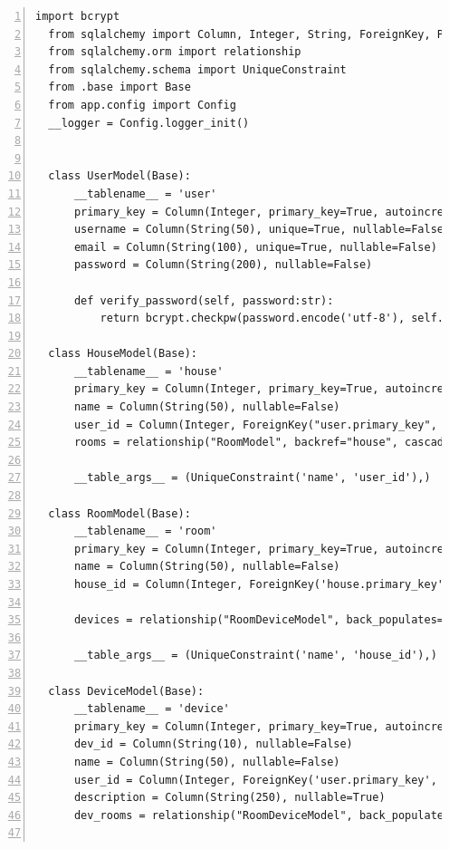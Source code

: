 \documentclass[12pt, letterpaper]{article}
\begin{document}
\begin{lstlisting}[frame=single, style=py, numbers=left, label={lst:dbmodels}, caption={db: models.py}]
  import bcrypt
  from sqlalchemy import Column, Integer, String, ForeignKey, PrimaryKeyConstraint
  from sqlalchemy.orm import relationship
  from sqlalchemy.schema import UniqueConstraint
  from .base import Base
  from app.config import Config
  __logger = Config.logger_init()
  
  
  class UserModel(Base):
      __tablename__ = 'user'
      primary_key = Column(Integer, primary_key=True, autoincrement=True, nullable=False)
      username = Column(String(50), unique=True, nullable=False)
      email = Column(String(100), unique=True, nullable=False)
      password = Column(String(200), nullable=False)
      
      def verify_password(self, password:str):
          return bcrypt.checkpw(password.encode('utf-8'), self.password)
  
  class HouseModel(Base):
      __tablename__ = 'house'
      primary_key = Column(Integer, primary_key=True, autoincrement=True, nullable=False)
      name = Column(String(50), nullable=False)
      user_id = Column(Integer, ForeignKey("user.primary_key", ondelete='CASCADE'), nullable=False)
      rooms = relationship("RoomModel", backref="house", cascade="all, delete-orphan", lazy='selectin')
  
      __table_args__ = (UniqueConstraint('name', 'user_id'),)
  
  class RoomModel(Base):
      __tablename__ = 'room'
      primary_key = Column(Integer, primary_key=True, autoincrement=True, nullable=False)
      name = Column(String(50), nullable=False)
      house_id = Column(Integer, ForeignKey('house.primary_key', ondelete='CASCADE'), nullable=False)
      
      devices = relationship("RoomDeviceModel", back_populates="room", cascade="all, delete-orphan", lazy='selectin')
  
      __table_args__ = (UniqueConstraint('name', 'house_id'),)
  
  class DeviceModel(Base):
      __tablename__ = 'device'
      primary_key = Column(Integer, primary_key=True, autoincrement=True, nullable=False)
      dev_id = Column(String(10), nullable=False)
      name = Column(String(50), nullable=False)
      user_id = Column(Integer, ForeignKey('user.primary_key', ondelete='CASCADE'), nullable=False, unique=False)
      description = Column(String(250), nullable=True)
      dev_rooms = relationship("RoomDeviceModel", back_populates="device", cascade="all, delete-orphan", lazy='selectin')
  

\end{lstlisting}
\end{document}
